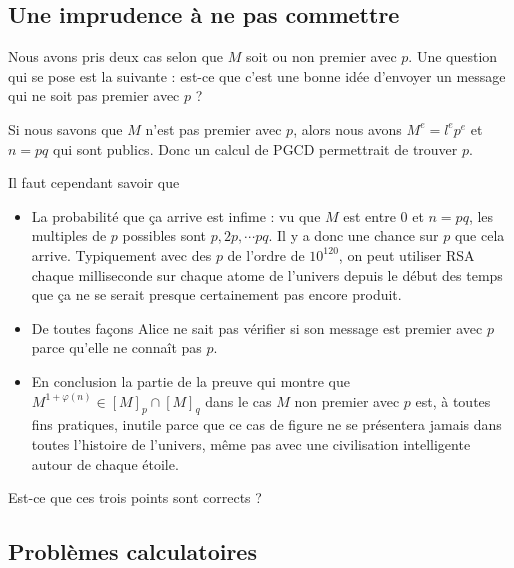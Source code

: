 \subsection{Une imprudence à ne pas commettre}

Nous avons pris deux cas selon que \( M\) soit ou non premier avec \( p\). Une question qui se pose est la suivante : est-ce que c'est une bonne idée d'envoyer un message qui ne soit pas premier avec \( p\) ?

Si nous savons que \( M\) n'est pas premier avec \( p\), alors nous avons \( M^e=l^ep^e\) et \( n=pq\) qui sont publics. Donc un calcul de PGCD permettrait de trouver \( p\).

Il faut cependant savoir que \label{PageAKTBooMDeQxY}
\begin{itemize}
	\item La probabilité que ça arrive est infime : vu que \( M\) est entre \( 0\) et \( n=pq\), les multiples de \( p\) possibles sont \( p,2p,\cdots pq\). Il y a donc une chance sur \( p\) que cela arrive. Typiquement avec des \( p\) de l'ordre de \( 10^{120}\), on peut utiliser RSA chaque milliseconde sur chaque atome de l'univers depuis le début des temps que ça ne se serait presque certainement pas encore produit.
	\item
	      De toutes façons Alice ne sait pas vérifier si son message est premier avec \( p\) parce qu'elle ne connaît pas \( p\).
	\item
	      En conclusion la partie de la preuve qui montre que \( M^{1+\varphi(n)}\in [M]_p\cap[M]_q\) dans le cas \( M\) non premier avec \( p\) est, à toutes fins pratiques, inutile parce que ce cas de figure ne se présentera jamais dans toutes l'histoire de l'univers, même pas avec une civilisation intelligente autour de chaque étoile.
\end{itemize}

\begin{probleme}\label{ProbGAYFooZATuYy}
	Est-ce que ces trois points sont corrects ?
\end{probleme}

\subsection{Problèmes calculatoires}

